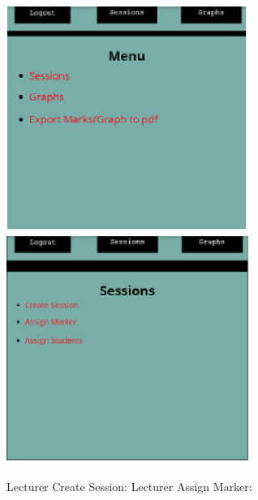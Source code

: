 \documentclass{article}
\begin{document}
\noindent \textbf{\includegraphics*[width=3.12in, height=2.90in, keepaspectratio=false]{image7}  \includegraphics*[width=3.15in, height=2.92in, keepaspectratio=false]{image8}  }

\noindent \textbf{}

\noindent \textbf{}

\noindent \textbf{}

\noindent \textbf{}

\noindent \textbf{}

  Lecturer Create Session:    Lecturer Assign Marker:
\end{document}
